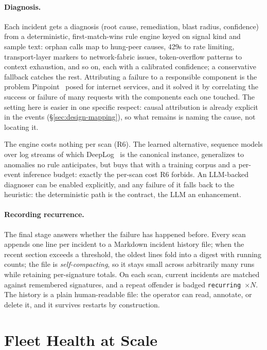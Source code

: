 \paragraph{Diagnosis.} Each incident gets a diagnosis (root cause,
remediation, blast radius, confidence) from a deterministic,
first-match-wins rule engine keyed on signal kind and sample text: orphan
calls map to hung-peer causes, 429s to rate limiting, transport-layer
markers to network-fabric issues, token-overflow patterns to context
exhaustion, and so on, each with a calibrated confidence; a conservative
fallback catches the rest. Attributing a failure to a responsible component
is the problem Pinpoint~\cite{chen2002pinpoint} posed for internet
services, and it solved it by correlating the success or failure of many
requests with the components each one touched. The setting here is easier
in one specific respect: causal attribution is already explicit in the
events (\S\ref{sec:design-mapping}), so what remains is naming the cause,
not locating it.

The engine costs nothing per scan (R6). The learned alternative, sequence
models over log streams of which DeepLog~\cite{du2017deeplog} is the
canonical instance, generalizes to anomalies no rule anticipates, but buys
that with a training corpus and a per-event inference budget: exactly the
per-scan cost R6 forbids. An
LLM-backed diagnoser can be enabled explicitly, and any failure of it falls
back to the heuristic: the deterministic path is the contract, the LLM
an enhancement.

\paragraph{Recording recurrence.} The final stage answers whether the
failure has happened before. Every scan
appends one line
per incident to a Markdown incident history file; when the recent section
exceeds a threshold, the oldest lines fold into a digest with running
counts; the file is \emph{self-compacting}, so it stays small across
arbitrarily many runs while retaining per-signature totals. On each scan,
current incidents are matched against remembered signatures, and a repeat
offender is badged \texttt{recurring $\times N$}. The history is a plain
human-readable file: the operator can read, annotate, or delete it, and it
survives restarts by construction.

\section{Fleet Health at Scale}
\label{sec:analytics-fleet}

